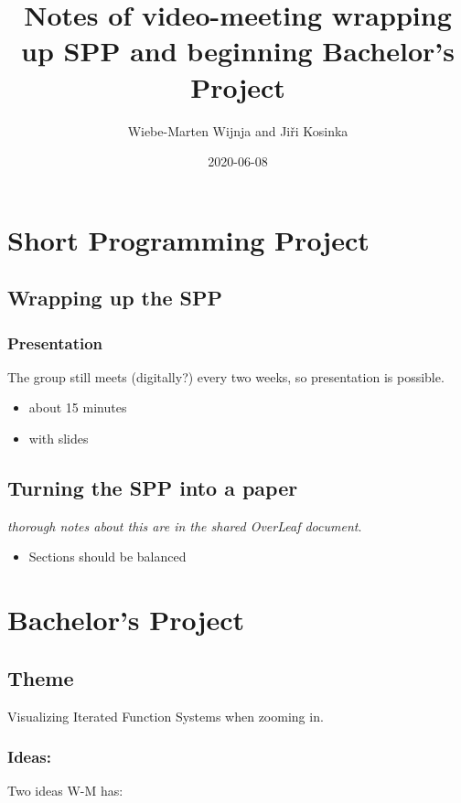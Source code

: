 \documentclass[11pt]{article}
\author{Wiebe-Marten Wijnja and Jiři Kosinka}
\date{2020-06-08}
\title{Notes of video-meeting wrapping up SPP and beginning Bachelor's Project}
\begin{document}
\maketitle


\section{Short Programming Project}
\label{sec:org920b62b}
\subsection{Wrapping up the SPP}
\label{sec:orgf156ee3}
\subsubsection{Presentation}
\label{sec:org2d52582}

The group still meets (digitally?) every two weeks, so presentation is possible.

\begin{itemize}
\item about 15 minutes
\item with slides
\end{itemize}

\subsection{Turning the SPP into a paper}
\label{sec:orgff4f63e}
\emph{thorough notes about this are in the shared OverLeaf document}.

\begin{itemize}
\item Sections should be balanced
\end{itemize}

\section{Bachelor's Project}
\label{sec:org5293e88}
\subsection{Theme}
\label{sec:org6833ba4}
Visualizing Iterated Function Systems when zooming in.

\subsubsection{Ideas:}
\label{sec:org86f2887}
Two ideas W-M has:
\end{document}

